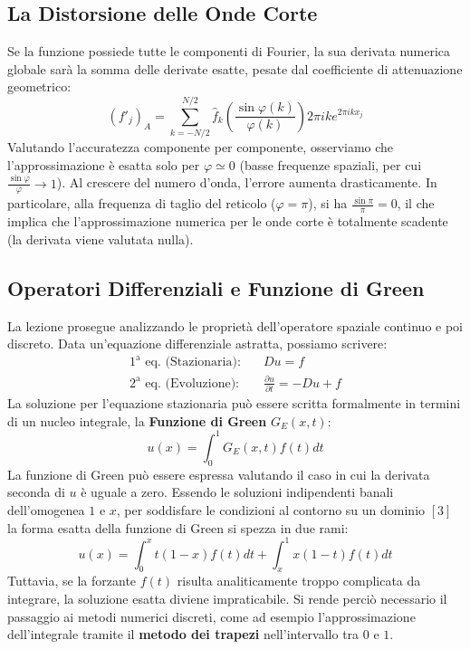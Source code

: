 \documentclass[12pt,a4paper]{article}
\begin{document}
\subsection{La Distorsione delle Onde Corte}
Se la funzione possiede tutte le componenti di Fourier, la sua derivata numerica globale sarà la somma delle derivate esatte, pesate dal coefficiente di attenuazione geometrico:
\begin{equation}
(f'_j)_A = \sum_{k=-N/2}^{N/2} \hat{f}_k \left( \frac{\sin \varphi(k)}{\varphi(k)} \right) 2\pi i k e^{2\pi i k x_j}
\end{equation}
Valutando l'accuratezza componente per componente, osserviamo che l'approssimazione è esatta solo per $\varphi \simeq 0$ (basse frequenze spaziali, per cui $\frac{\sin \varphi}{\varphi} \to 1$). 
Al crescere del numero d'onda, l'errore aumenta drasticamente. In particolare, alla frequenza di taglio del reticolo ($\varphi = \pi$), si ha $\frac{\sin \pi}{\pi} = 0$, il che implica che l'approssimazione numerica per le onde corte è totalmente scadente (la derivata viene valutata nulla).

\subsection{Operatori Differenziali e Funzione di Green}
La lezione prosegue analizzando le proprietà dell'operatore spaziale continuo e poi discreto. Data un'equazione differenziale astratta, possiamo scrivere:
\begin{align}
1^\text{a} \text{ eq. (Stazionaria):} \quad & Du = f \\
2^\text{a} \text{ eq. (Evoluzione):} \quad & \frac{\partial u}{\partial t} = -Du + f
\end{align}
La soluzione per l'equazione stazionaria può essere scritta formalmente in termini di un nucleo integrale, la \textbf{Funzione di Green} $G_E(x,t)$:
\begin{equation}
u(x) = \int_0^1 G_E(x,t) f(t) dt
\end{equation}
La funzione di Green può essere espressa valutando il caso in cui la derivata seconda di $u$ è uguale a zero. Essendo le soluzioni indipendenti banali dell'omogenea $1$ e $x$, per soddisfare le condizioni al contorno su un dominio $[3]$ la forma esatta della funzione di Green si spezza in due rami:
\begin{equation}
u(x) = \int_0^x t(1-x)f(t)dt + \int_x^1 x(1-t)f(t)dt
\end{equation}
Tuttavia, se la forzante $f(t)$ risulta analiticamente troppo complicata da integrare, la soluzione esatta diviene impraticabile. Si rende perciò necessario il passaggio ai metodi numerici discreti, come ad esempio l'approssimazione dell'integrale tramite il \textbf{metodo dei trapezi} nell'intervallo tra $0$ e $1$.
\end{document}
